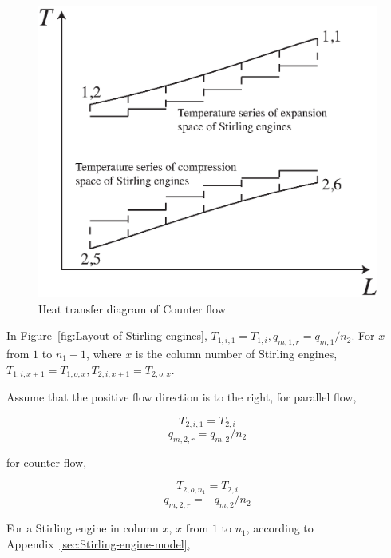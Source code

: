 \documentclass{article}
\begin{document}
\noindent \begin{figure}[htbp]
\begin{center}
	\includegraphics[width = 0.7\columnwidth]{./graphics/HeatTransfer_Counter}
	\caption{Heat transfer diagram of Counter flow}
	\label{fig:CounterFlow}
\end{center}
\end{figure}

In Figure~\ref{fig:Layout of Stirling engines}, $T_{1,i,1}=T_{1,i},q_{m,1,r}=q_{m,1}/n_{2}$. For $x$ from $1$ to $n_{1}-1$, where $x$ is the column number of Stirling engines, $T_{1,i,x+1}=T_{1,o,x},T_{2,i,x+1}=T_{2,o,x}$.

Assume that the positive flow direction is to the right, for parallel flow,

\begin{equation*}
	T_{2,i,1}=T_{2,i}\label{eq:T_2_i_1}
\end{equation*}
\begin{equation*}
	q_{m,2,r}=q_{m,2}/n_{2}
\end{equation*}

for counter flow,

\begin{equation*}
	T_{2,o,n_{1}}=T_{2,i}\label{eq:T_2_o_n1}
\end{equation*}
\begin{equation*}
	q_{m,2,r}=-q_{m,2}/n_{2}
\end{equation*}

For a Stirling engine in column $x$, $x$ from $1$ to $n_{1}$, according to Appendix~\ref{sec:Stirling-engine-model},
\end{document}
